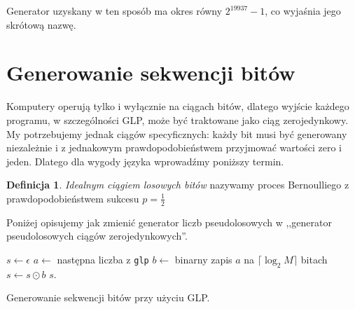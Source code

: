\documentclass[a4paper,11pt,twoside]{book}
\newcommand{\ceil}[1]{\lceil#1\rceil}
\theoremstyle{definition}
\newtheorem{mydef}{Definicja}[chapter]
\begin{document}
Generator uzyskany w ten sposób ma okres równy $2^{19937}-1$, co wyjaśnia jego skrótową nazwę.

\section{Generowanie sekwencji bitów}
Komputery operują tylko i wyłącznie na ciągach bitów, dlatego wyjście każdego programu, w szczególności GLP, może być traktowane jako ciąg zerojedynkowy. My potrzebujemy jednak ciągów specyficznych: każdy bit musi być generowany niezależnie i z jednakowym prawdopodobieństwem przyjmować wartości zero i jeden. Dlatego dla wygody języka wprowadźmy poniższy termin.
\begin{mydef}
 \textit{Idealnym ciągiem losowych bitów} nazywamy proces Bernoulliego z prawdopodobieństwem sukcesu $p = \frac{1}{2}$
\end{mydef}

Poniżej opisujemy jak zmienić generator liczb pseudolosowych w ,,generator pseudolosowych ciągów zerojedynkowych''.

\begin{algorithm}
 \begin{algorithmic}[1]
    \State $s \gets \epsilon$
      \State $a \gets$ następna liczba z \texttt{glp}
      \State $b \gets$ binarny zapis $a$ na $\ceil{\log_2 M}$ bitach
      \State $s \gets s \odot b$
     \EndWhile
    \State \Return $s$.
  \EndFunction
 \end{algorithmic}
 \caption{Generowanie sekwencji bitów przy użyciu GLP.}
 \label{alg:GenerateBitSequence}
\end{algorithm}

\end{document}
